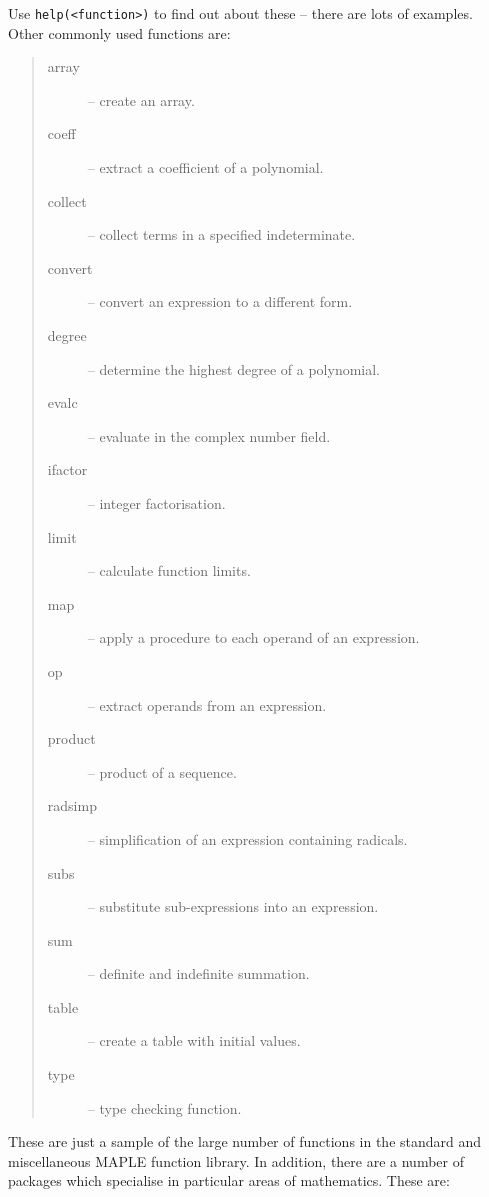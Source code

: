 \documentclass[twoside,11pt]{starlink}
\begin{document}
Use \verb+help(<function>)+ to find out about these -- there are lots of
examples. Other commonly used functions are:

\begin{quote}
\begin{description}

\item [array] -- create an array.
\item [coeff] -- extract a coefficient of a polynomial.
\item [collect] -- collect terms in a specified indeterminate.
\item [convert] -- convert an expression to a different form.
\item [degree] -- determine the highest degree of a polynomial.
\item [evalc] -- evaluate in the complex number field.
\item [ifactor] -- integer factorisation.
\item [limit] -- calculate function limits.
\item [map] -- apply a procedure to each operand of an expression.
\item [op] -- extract operands from an expression.
\item [product] -- product of a sequence.
\item [radsimp] -- simplification of an expression containing radicals.
\item [subs] -- substitute sub-expressions into an expression.
\item [sum] -- definite and indefinite summation.
\item [table] -- create a table with initial values.
\item [type] -- type checking function.

\end{description}
\end{quote}

These are just a sample of the large number of functions in the standard and
miscellaneous MAPLE function library. In addition, there are a number of
packages which specialise in particular areas of mathematics. These are:
\end{document}

